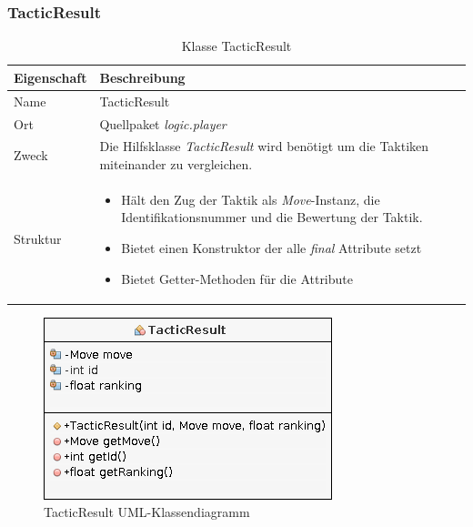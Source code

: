    \subsubsection{TacticResult}
        \begin{table}[H]
            \caption{Klasse TacticResult}
            \begin{tabular}{p{2.5cm}  p{9.5cm}} 
                \hline
                \textbf{Eigenschaft} & \textbf{Beschreibung}\\
                \hline
                Name & TacticResult\\
                Ort & Quellpaket \textit{logic.player}\\
                \hline
                Zweck &
                Die Hilfsklasse \textit{TacticResult} wird benötigt um die Taktiken miteinander zu vergleichen. 
                \\
                \hline
                Struktur &
                \begin{itemize}
                    \itemsep0em
                    \item Hält den Zug der Taktik als \textit{Move}-Instanz, die Identifikationsnummer und die Bewertung der Taktik.
                    \item Bietet einen Konstruktor der alle \textit{final} Attribute setzt
                    \item Bietet Getter-Methoden für die Attribute
                \end{itemize}
                \\
                \hline
            \end{tabular}
        \end{table}
        \begin{figure}[H]
            \centering
            \includegraphics[scale=0.7]{img/uml/tacticResult.png}   
            \caption{TacticResult UML-Klassendiagramm}
        \end{figure}

